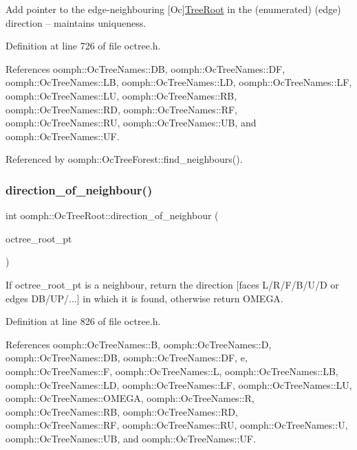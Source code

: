 Add pointer to the edge-\/neighbouring \mbox{[}Oc\mbox{]}\hyperlink{classoomph_1_1TreeRoot}{Tree\+Root} in the (enumerated) (edge) direction -- maintains uniqueness. 



Definition at line 726 of file octree.\+h.



References oomph\+::\+Oc\+Tree\+Names\+::\+DB, oomph\+::\+Oc\+Tree\+Names\+::\+DF, oomph\+::\+Oc\+Tree\+Names\+::\+LB, oomph\+::\+Oc\+Tree\+Names\+::\+LD, oomph\+::\+Oc\+Tree\+Names\+::\+LF, oomph\+::\+Oc\+Tree\+Names\+::\+LU, oomph\+::\+Oc\+Tree\+Names\+::\+RB, oomph\+::\+Oc\+Tree\+Names\+::\+RD, oomph\+::\+Oc\+Tree\+Names\+::\+RF, oomph\+::\+Oc\+Tree\+Names\+::\+RU, oomph\+::\+Oc\+Tree\+Names\+::\+UB, and oomph\+::\+Oc\+Tree\+Names\+::\+UF.



Referenced by oomph\+::\+Oc\+Tree\+Forest\+::find\+\_\+neighbours().

\mbox{\label{classoomph_1_1OcTreeRoot_a6b6730957601b05b991ffc9972d31f8b}} 
\subsubsection{\texorpdfstring{direction\+\_\+of\+\_\+neighbour()}{direction\_of\_neighbour()}}
{\footnotesize\ttfamily int oomph\+::\+Oc\+Tree\+Root\+::direction\+\_\+of\+\_\+neighbour (\begin{DoxyParamCaption}\item[{\hyperlink{classoomph_1_1TreeRoot}{Tree\+Root} $\ast$}]{octree\+\_\+root\+\_\+pt }\end{DoxyParamCaption})\hspace{0.3cm}{\ttfamily [inline]}}



If octree\+\_\+root\+\_\+pt is a neighbour, return the direction \mbox{[}faces L/\+R/\+F/\+B/\+U/D or edges D\+B/\+U\+P/...\mbox{]} in which it is found, otherwise return O\+M\+E\+GA. 



Definition at line 826 of file octree.\+h.



References oomph\+::\+Oc\+Tree\+Names\+::B, oomph\+::\+Oc\+Tree\+Names\+::D, oomph\+::\+Oc\+Tree\+Names\+::\+DB, oomph\+::\+Oc\+Tree\+Names\+::\+DF, e, oomph\+::\+Oc\+Tree\+Names\+::F, oomph\+::\+Oc\+Tree\+Names\+::L, oomph\+::\+Oc\+Tree\+Names\+::\+LB, oomph\+::\+Oc\+Tree\+Names\+::\+LD, oomph\+::\+Oc\+Tree\+Names\+::\+LF, oomph\+::\+Oc\+Tree\+Names\+::\+LU, oomph\+::\+Oc\+Tree\+Names\+::\+O\+M\+E\+GA, oomph\+::\+Oc\+Tree\+Names\+::R, oomph\+::\+Oc\+Tree\+Names\+::\+RB, oomph\+::\+Oc\+Tree\+Names\+::\+RD, oomph\+::\+Oc\+Tree\+Names\+::\+RF, oomph\+::\+Oc\+Tree\+Names\+::\+RU, oomph\+::\+Oc\+Tree\+Names\+::U, oomph\+::\+Oc\+Tree\+Names\+::\+UB, and oomph\+::\+Oc\+Tree\+Names\+::\+UF.



